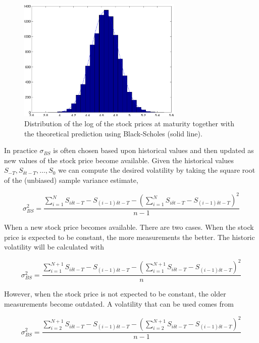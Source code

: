 \documentclass[11pt,a4paper]{article}
\begin{document}
\begin{figure}[H]
  \centering
  \includegraphics[width=0.7\textwidth]{dist.pdf}
  \caption{Distribution of the log of the stock prices at maturity together with the theoretical prediction using Black-Scholes (solid line).}
  \label{fig:dist}
\end{figure}

In practice $\sigma_{BS}$ is often chosen based upon historical values and then updated as new values of the stock price become available. Given the historical values $S_{-T},S_{\delta t-T},\ldots,S_0$ we can compute the desired volatility by taking the square root of the (unbiased) sample variance estimate,

\begin{equation}
\sigma_{BS}^2=\frac{\sum_{i=1}^N S_{i\delta t-T}-S_{(i-1)\delta t-T}-\left(\sum_{i=1}^N S_{i\delta t-T}-S_{(i-1)\delta t-T}\right)^2}{n-1}
\end{equation}

When a new stock price becomes available. There are two cases. When the stock price is expected to be constant, the more measurements the better. The historic volatility will be calculated with

\begin{equation}
\sigma_{BS}^2=\frac{\sum_{i=1}^{N+1} S_{i\delta t-T}-S_{(i-1)\delta t-T}-\left(\sum_{i=1}^{N+1} S_{i\delta t-T}-S_{(i-1)\delta t-T}\right)^2}{n}
\end{equation}

However, when the stock price is not expected to be constant, the older measurements become outdated. A volatility that can be used comes from

\begin{equation}
\sigma_{BS}^2=\frac{\sum_{i=2}^{N+1} S_{i\delta t-T}-S_{(i-1)\delta t-T}-\left(\sum_{i=2}^{N+1} S_{i\delta t-T}-S_{(i-1)\delta t-T}\right)^2}{n-1}
\end{equation}
\end{document}
